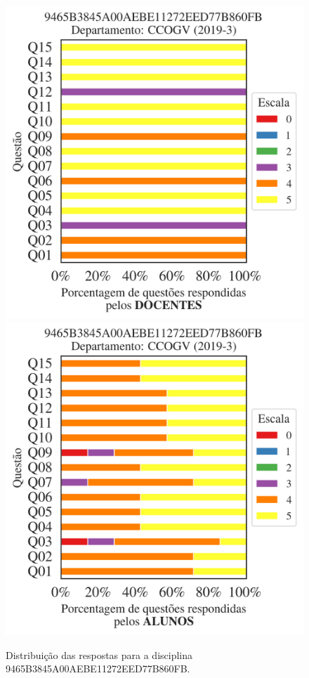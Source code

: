 \documentclass[a4paper,10pt]{article}
\begin{document}
\begin{figure}[h]
\centering
\includegraphics[width=0.485\linewidth]{analise_disciplina_departamento_CCOGV_9465B3845A00AEBE11272EED77B860FB_docentes.png}
\includegraphics[width=0.485\linewidth]{analise_disciplina_departamento_CCOGV_9465B3845A00AEBE11272EED77B860FB_alunos.png}
\caption{\label{fig:analise_geral_departamento}                Distribuição das respostas para a disciplina 9465B3845A00AEBE11272EED77B860FB. }
\end{figure}
\end{document}
